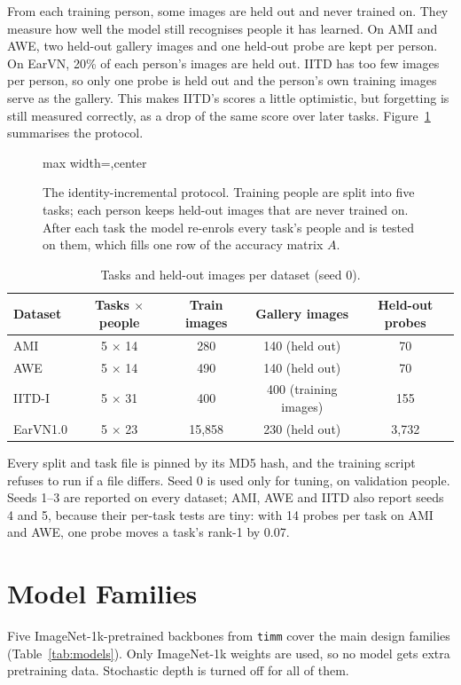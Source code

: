 \documentclass[12pt,a4paper]{report}
\newcommand{\diagram}[1]{\begin{adjustbox}{max width=\textwidth,center}\end{adjustbox}}
\begin{document}
From each training person, some images are held out and never trained on. They measure how well the model still recognises people it has learned. On AMI and AWE, two held-out gallery images and one held-out probe are kept per person. On EarVN, 20\% of each person's images are held out. IITD has too few images per person, so only one probe is held out and the person's own training images serve as the gallery. This makes IITD's scores a little optimistic, but forgetting is still measured correctly, as a drop of the same score over later tasks. Figure~\ref{fig:protocol} summarises the protocol.

\begin{figure}[H]
\centering
\diagram{protocol}
\caption{The identity-incremental protocol. Training people are split into five tasks; each person keeps held-out images that are never trained on. After each task the model re-enrols every task's people and is tested on them, which fills one row of the accuracy matrix $A$.}
\label{fig:protocol}
\end{figure}

\begin{table}[H]
\centering
\small
\caption{Tasks and held-out images per dataset (seed 0).}
\label{tab:tasks}
\begin{tabular}{|l|c|c|c|c|}
\hline
\textbf{Dataset} & \textbf{Tasks $\times$ people} & \textbf{Train images} & \textbf{Gallery images} & \textbf{Held-out probes} \\
\hline
AMI & 5 $\times$ 14 & 280 & 140 (held out) & 70 \\
AWE & 5 $\times$ 14 & 490 & 140 (held out) & 70 \\
IITD-I & 5 $\times$ 31 & 400 & 400 (training images) & 155 \\
EarVN1.0 & 5 $\times$ 23 & 15,858 & 230 (held out) & 3,732 \\
\hline
\end{tabular}
\end{table}

Every split and task file is pinned by its MD5 hash, and the training script refuses to run if a file differs. Seed 0 is used only for tuning, on validation people. Seeds 1--3 are reported on every dataset; AMI, AWE and IITD also report seeds 4 and 5, because their per-task tests are tiny: with 14 probes per task on AMI and AWE, one probe moves a task's rank-1 by 0.07.

\section{Model Families}
Five ImageNet-1k-pretrained backbones from \texttt{timm} \cite{wightman2019timm} cover the main design families (Table~\ref{tab:models}). Only ImageNet-1k weights are used, so no model gets extra pretraining data. Stochastic depth is turned off for all of them.
\end{document}
